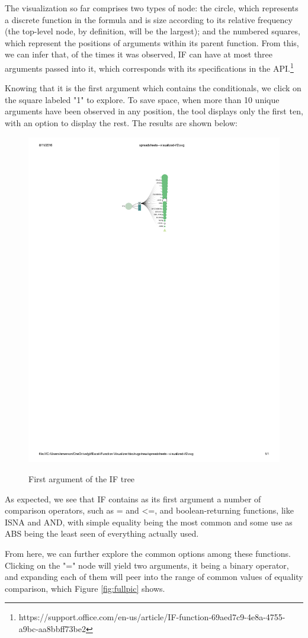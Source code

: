 \documentclass[conference]{IEEEtran}
\begin{document}
	The visualization so far comprises two types of node: the circle, which
	represents a discrete function in the formula and is size according to its
	relative frequency (the top-level node, by definition, will be the largest);
	and the numbered squares, which represent the positions of arguments within its
	parent function. From this, we can infer that, of the times it was observed, IF
	can have at most three arguments passed into it, which corresponds with its
	specifications in the
	API.\footnote{https://support.office.com/en-us/article/IF-function-69aed7c9-4e8a-4755-a9bc-aa8bbff73be2} \par
	
	Knowing that it is the first argument which contains the conditionals, we click
	on the square labeled "1" to explore. To save space, when more than 10 unique
	arguments have been observed in any position, the tool displays only the first
	ten, with an option to display the rest. The results are shown below:
	
	\begin{figure}
		\centering
		\includegraphics[width=.43\textwidth]{IFexpand}
		\label{fig:expandif}
		\caption{First argument of the IF tree}
	\end{figure}
	
	As expected, we see that IF contains as its first argument a number of
	comparison operators, such as = and <=, and boolean-returning functions, like
	ISNA and AND, with simple equality being the most common and some use as ABS
	being the least seen of everything actually used. \par
	
	From here, we can further explore the common options among these functions.
	Clicking on the "=" node will yield two arguments, it being a binary operator,
	and expanding each of them will peer into the range of common values of
	equality comparison, which Figure \ref{fig:fullpic} shows. \par
	
\end{document}
